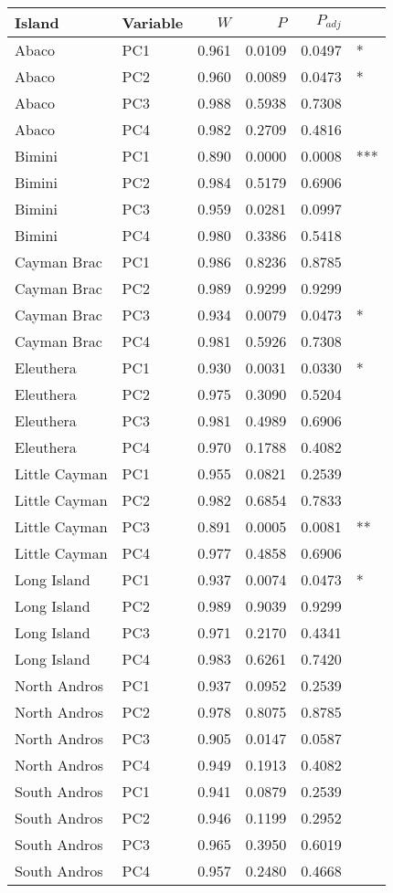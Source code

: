 
\begin{tabular}{llrrrl}
\toprule
Island & Variable & $W$ & $P$ & $P_{adj}$ & \\
\midrule
Abaco & PC1 & 0.961 & 0.0109 & 0.0497 & *\\
Abaco & PC2 & 0.960 & 0.0089 & 0.0473 & *\\
Abaco & PC3 & 0.988 & 0.5938 & 0.7308 & \\
Abaco & PC4 & 0.982 & 0.2709 & 0.4816 & \\
Bimini & PC1 & 0.890 & 0.0000 & 0.0008 & ***\\
Bimini & PC2 & 0.984 & 0.5179 & 0.6906 & \\
Bimini & PC3 & 0.959 & 0.0281 & 0.0997 & \\
Bimini & PC4 & 0.980 & 0.3386 & 0.5418 & \\
Cayman Brac & PC1 & 0.986 & 0.8236 & 0.8785 & \\
Cayman Brac & PC2 & 0.989 & 0.9299 & 0.9299 & \\
Cayman Brac & PC3 & 0.934 & 0.0079 & 0.0473 & *\\
Cayman Brac & PC4 & 0.981 & 0.5926 & 0.7308 & \\
Eleuthera & PC1 & 0.930 & 0.0031 & 0.0330 & *\\
Eleuthera & PC2 & 0.975 & 0.3090 & 0.5204 & \\
Eleuthera & PC3 & 0.981 & 0.4989 & 0.6906 & \\
Eleuthera & PC4 & 0.970 & 0.1788 & 0.4082 & \\
Little Cayman & PC1 & 0.955 & 0.0821 & 0.2539 & \\
Little Cayman & PC2 & 0.982 & 0.6854 & 0.7833 & \\
Little Cayman & PC3 & 0.891 & 0.0005 & 0.0081 & **\\
Little Cayman & PC4 & 0.977 & 0.4858 & 0.6906 & \\
Long Island & PC1 & 0.937 & 0.0074 & 0.0473 & *\\
Long Island & PC2 & 0.989 & 0.9039 & 0.9299 & \\
Long Island & PC3 & 0.971 & 0.2170 & 0.4341 & \\
Long Island & PC4 & 0.983 & 0.6261 & 0.7420 & \\
North Andros & PC1 & 0.937 & 0.0952 & 0.2539 & \\
North Andros & PC2 & 0.978 & 0.8075 & 0.8785 & \\
North Andros & PC3 & 0.905 & 0.0147 & 0.0587 & \\
North Andros & PC4 & 0.949 & 0.1913 & 0.4082 & \\
South Andros & PC1 & 0.941 & 0.0879 & 0.2539 & \\
South Andros & PC2 & 0.946 & 0.1199 & 0.2952 & \\
South Andros & PC3 & 0.965 & 0.3950 & 0.6019 & \\
South Andros & PC4 & 0.957 & 0.2480 & 0.4668 & \\
\bottomrule
\end{tabular}